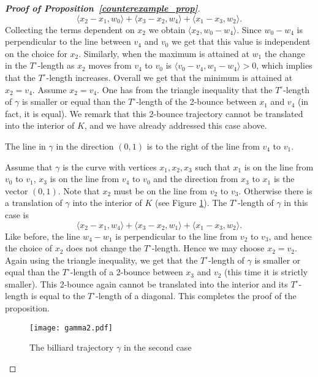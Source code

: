 \documentclass[10pt,a4paper]{article}
\theoremstyle{definition}
\begin{document}
\begin{proof}[{\bf Proof of Proposition~\ref{counterexample_prop}}]
$$ \langle x_2 - x_1, w_0\rangle + \langle x_3 - x_2, w_4 \rangle + \langle x_1 - x_3, w_2 \rangle. $$
Collecting the terms dependent on $x_2$ we obtain $ \langle x_2, w_0 - w_4 \rangle$. Since $w_0 - w_4$ is perpendicular to the line between $v_4$ and $v_0$ we get that this value is independent on the choice for $x_2$. 
Similarly, when the maximum is attained at $w_1$ the change in the $T^\circ$-length as $x_2$ moves from $v_4$ to $v_0$ is $\langle v_0 - v_4, w_1 - w_4 \rangle > 0$, which implies that the $T^\circ$-length increases.
Overall we get that the minimum is attained at $x_2 = v_4$.
Assume $x_2=v_4$. One has from the triangle inequality that the $T^\circ$-length of $\gamma$ is smaller or equal than the $T^\circ$-length of the 2-bounce between $x_1$ and $v_4$ (in fact, it is equal). 
We remark that this 2-bounce trajectory cannot be translated into the interior of $K$, and we have already addressed this case above. 
 


\begin{center} \begin{it} The line in $\gamma$ in the direction $(0,1)$ is to the right of the line from $v_4$ to $v_1$.\end{it} \end{center}
Assume that $\gamma$ is the curve with vertices $x_1, x_2, x_3$ such that $x_1$ is on the line from $v_0$ to $v_1$, $x_3$ is on the line from $v_4$ to $v_0$ and the direction from $x_3$ to $x_1$ is the vector $(0,1)$. Note that $x_2$ must be on the line from $v_2$ to $v_3$. Otherwise there is a translation of $\gamma$ into the interior of $K$ (see Figure \ref{gamma2Fig}).
The $T^\circ$-length of $\gamma$ in this case is
$$ \langle x_2 - x_1, w_4 \rangle + \langle x_3 - x_2, w_1 \rangle + \langle x_1 - x_3, w_2 \rangle .$$
Like before, the line $w_4 - w_1$ is perpendicular to the line from $v_2$ to $v_3$, and hence the choice of $x_2$ does not change the $T^\circ$-length. Hence we may choose $x_2 = v_2$. Again using the triangle inequality, we get that the $T^\circ$-length of $\gamma$ is smaller or equal than the $T^\circ$-length of a 2-bounce between $x_3$ and $v_2$ (this time it is strictly smaller). This 2-bounce again cannot be translated into the interior and its $T^{\circ}$-length is equal to the $T^\circ$-length of a diagonal. This completes the proof of the proposition. 

\begin{figure}[H]
\centering
\texttt{[image: gamma2.pdf]}
	 	\caption{The billiard trajectory $\gamma$ in the second case}
	 	\label{gamma2Fig}
\end{figure}


\end{proof}
\end{document}
